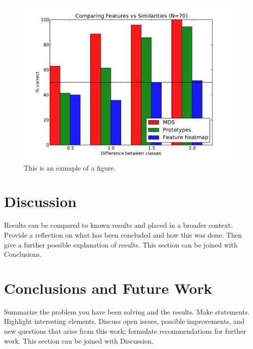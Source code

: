 \documentclass[english]{article}
\begin{document}
\begin{figure}
\includegraphics[width=0.9\linewidth]{exampleFig}
\caption{This is an exmaple of a figure.}
\label{fig:figure_example}
\end{figure}

\section{Discussion}
\label{sec:disc}
Results can be compared to known results and placed in a broader context.
Provide a reflection on what has been concluded and how this was done.
Then give a further possible explanation of results.
This section can be joined with Conclusions.

\section{Conclusions and Future Work}
\label{sec:concl}
Summarize the problem you have been solving and the results.
Make statements.
Highlight interesting elements.
Discuss open issues, possible improvements, and new questions that arise from this work; formulate recommendations for further work.
This section can be joined with Discussion.








\end{document}
